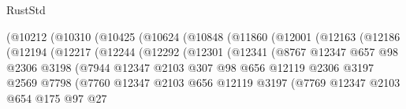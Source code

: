 \begin{lexlean}{RustStd}
\begin{coremodule}
                        (@10212
                          (@10310
                            (@10425
                              (@10624
                                (@10848
                                  (@11860
                                    (@12001
                                      (@12163
                                        (@12186
                                          (@12194
                                            (@12217
                                              (@12244
                                                (@12292
                                                  (@12301
                                                    (@12341
                                                      (@8767
                                                        @12347
                                                        @657
                                                        @98
                                                        @2306
                                                        @3198
                                                        (@7944
                                                          @12347
                                                          @2103
                                                          @307
                                                          @98
                                                          @656
                                                          @12119
                                                          @2306
                                                          @3197
                                                          @2569
                                                          @7798
                                                          (@7760
                                                            @12347
                                                            @2103
                                                            @656
                                                            @12119
                                                            @3197
                                                            (@7769
                                                              @12347
                                                              @2103
                                                              @654
                                                              @175
                                                              @97
                                                              @27

\end{coremodule}
\end{lexlean}
